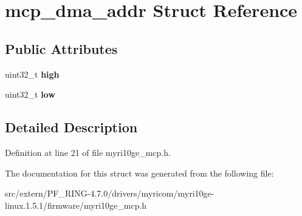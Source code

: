 \hypertarget{structmcp__dma__addr}{
\section{mcp\_\-dma\_\-addr Struct Reference}
\label{structmcp__dma__addr}
}
\subsection*{Public Attributes}
\begin{DoxyCompactItemize}
\item 
\hypertarget{structmcp__dma__addr_a0b67756efea91602835be48f14566dea}{
uint32\_\-t {\bfseries high}}
\label{structmcp__dma__addr_a0b67756efea91602835be48f14566dea}

\item 
\hypertarget{structmcp__dma__addr_a115d9da01008b91d4f2dfe54575d31dd}{
uint32\_\-t {\bfseries low}}
\label{structmcp__dma__addr_a115d9da01008b91d4f2dfe54575d31dd}

\end{DoxyCompactItemize}


\subsection{Detailed Description}


Definition at line 21 of file myri10ge\_\-mcp.h.



The documentation for this struct was generated from the following file:\begin{DoxyCompactItemize}
\item 
src/extern/PF\_\-RING-\/4.7.0/drivers/myricom/myri10ge-\/linux.1.5.1/firmware/myri10ge\_\-mcp.h\end{DoxyCompactItemize}
